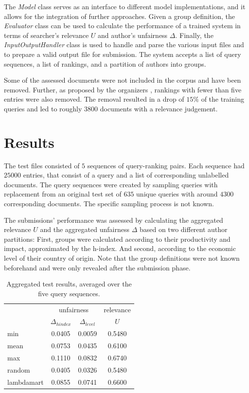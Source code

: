 \documentclass[sigconf, nonacm]{acmart}
\begin{document}
The \emph{Model} class serves as an interface to different model implementations, and it allows for the integration of further approaches. Given a group definition, the \emph{Evaluator} class can be used to calculate the performance of a trained system in terms of searcher's relevance $U$ and author's unfairness $\Delta$. Finally, the \emph{InputOutputHandler} class is used to handle and parse the various input files and to prepare a valid output file for submission. The system accepts a list of query sequences, a list of rankings, and a partition of authors into groups. 

Some of the assessed documents were not included in the corpus and have been removed. Further, as proposed by the organizers \cite{asia_biega_trec_2019}, rankings with fewer than five entries were also removed. The removal resulted in a drop of $15\%$ of the training queries and led to roughly $3800$ documents with a relevance judgement.

\section{Results}

The test files consisted of $5$ sequences of query-ranking pairs. Each sequence had $25000$ entries, that consist of a query and a list of corresponding unlabelled documents. The query sequences were created by sampling queries with replacement from an original test set of $635$ unique queries with around $4300$ corresponding documents. The specific sampling process is not known.

The submissions' performance was assessed by calculating the aggregated relevance $U$ and the aggregated unfairness $\Delta$ based on two different author partitions: First, groups were calculated according to their productivity and impact, approximated by the h-index. And second, according to the economic level of their country of origin. Note that the group definitions were not known beforehand and were only revealed after the submission phase.  

\begin{table}[h]
    \centering
    \begin{tabular}{lccc}
    \toprule
    & \multicolumn{2}{c}{unfairness} & relevance \\
    \cmidrule(r){2-3} \cmidrule(l){4-4}
     & $\Delta_{hindex}$ & $\Delta_{level}$ & $U$  \\
    min  & 0.0405 & 0.0059 & 0.5480  \\
    mean & 0.0753 & 0.0435 & 0.6100  \\
    max  & 0.1110 & 0.0832 & 0.6740  \\
    \midrule
    random & 0.0405 & 0.0326 & 0.5480 \\
    lambdamart & 0.0855 &0.0741 & 0.6600  \\
    \bottomrule
    \end{tabular}
    \caption{Aggregated test results, averaged over the five query sequences.}
    \label{tab:results}
\end{table}
\end{document}
